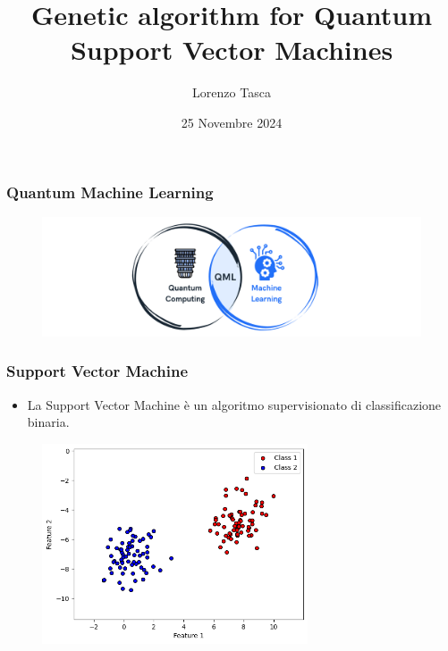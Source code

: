 \documentclass{beamer}
\title[Genetic algorithm for QSVM] 
{Genetic algorithm for Quantum Support Vector Machines}
\author[Lorenzo Tasca]
{Lorenzo Tasca}
\date[25/11/2024] 
{25 Novembre 2024}
\begin{document}
\frame{\titlepage}

\begin{frame}
\frametitle{Quantum Machine Learning}
\centering
\begin{figure}
      \includegraphics[width=1.1\textwidth]{images/1.png}
     \end{figure}
\end{frame}



\begin{frame}
  \frametitle{Support Vector Machine}
    \begin{itemize}
      \item     La Support Vector Machine è un algoritmo supervisionato di classificazione binaria. 
    \end{itemize}
      \begin{figure}
            \includegraphics[width=0.7\textwidth]{images/classicaldata.png}
       \end{figure}
  \end{frame}
\end{document}

